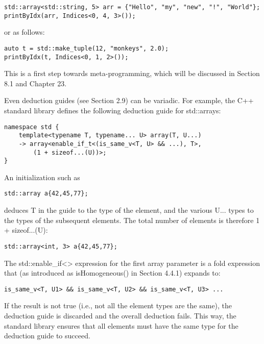 \begin{lstlisting}[style=styleCXX]
std::array<std::string, 5> arr = {"Hello", "my", "new", "!", "World"};
printByIdx(arr, Indices<0, 4, 3>());
\end{lstlisting}

or as follows:

\begin{lstlisting}[style=styleCXX]
auto t = std::make_tuple(12, "monkeys", 2.0);
printByIdx(t, Indices<0, 1, 2>());
\end{lstlisting}

This is a first step towards meta-programming, which will be discussed in Section 8.1 and Chapter 23.


Even deduction guides (see Section 2.9) can be variadic. For example, the C++ standard library defines the following deduction guide for std::arrays:

\begin{lstlisting}[style=styleCXX]
namespace std {
	template<typename T, typename... U> array(T, U...)
	-> array<enable_if_t<(is_same_v<T, U> && ...), T>,
		(1 + sizeof...(U))>;
}
\end{lstlisting}

An initialization such as

\begin{lstlisting}[style=styleCXX]
std::array a{42,45,77};
\end{lstlisting}

deduces T in the guide to the type of the element, and the various U... types to the types of the subsequent elements. The total number of elements is therefore 1 + sizeof...(U):

\begin{lstlisting}[style=styleCXX]
std::array<int, 3> a{42,45,77};
\end{lstlisting}

The std::enable\_if<> expression for the first array parameter is a fold expression that (as introduced as isHomogeneous() in Section 4.4.1) expands to:

\begin{lstlisting}[style=styleCXX]
is_same_v<T, U1> && is_same_v<T, U2> && is_same_v<T, U3> ...
\end{lstlisting}

If the result is not true (i.e., not all the element types are the same), the deduction guide is discarded and the overall deduction fails. This way, the standard library ensures that all elements must have the same type for the deduction guide to succeed.

